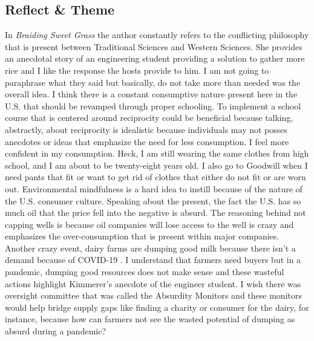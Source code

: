 \documentclass[a4paper,man,biblatex]{apa6}
\begin{document}
\subsection{Reflect \& Theme} In \textit{Braiding Sweet Grass} the author constantly refers to the conflicting philosophy that is present between Traditional Sciences and Western Sciences. She provides an anecdotal story of an engineering student providing a solution to gather more rice and I like the response the hosts provide to him. I am not going to paraphrase what they said but basically, do not take more than needed was the overall idea. I think there is a constant consumptive nature present here in the U.S. that should be revamped through proper schooling. To implement a school course that is centered around reciprocity could be beneficial because talking, abstractly, about reciprocity is idealistic because individuals may not posses anecdotes or ideas that emphasize the need for less consumption. I feel more confident in my consumption. Heck, I am still wearing the same clothes from high school, and I am about to be twenty-eight years old. I also go to Goodwill when I need pants that fit or want to get rid of clothes that either do not fit or are worn out. Environmental mindfulness is a hard idea to instill because of the nature of the U.S. consumer culture. Speaking about the present, the fact the U.S. has so much oil that the price fell into the negative is absurd. The reasoning behind not capping wells is because oil companies will lose access to the well is crazy and emphasizes the over-consumption that is present within major companies. Another crazy event, dairy farms are dumping good milk because there isn't a demand because of COVID-19 \autocite{dairyfarm}. I understand that farmers need buyers but in a pandemic, dumping good resources does not make sense and these wasteful actions highlight Kimmerer's anecdote of the engineer student. I wish there was oversight committee that was called the Absurdity Monitors and these monitors would help bridge supply gaps like finding a charity or consumer for the dairy, for instance, because how can farmers not see the wasted potential of dumping as absurd during a pandemic?
\end{document}
